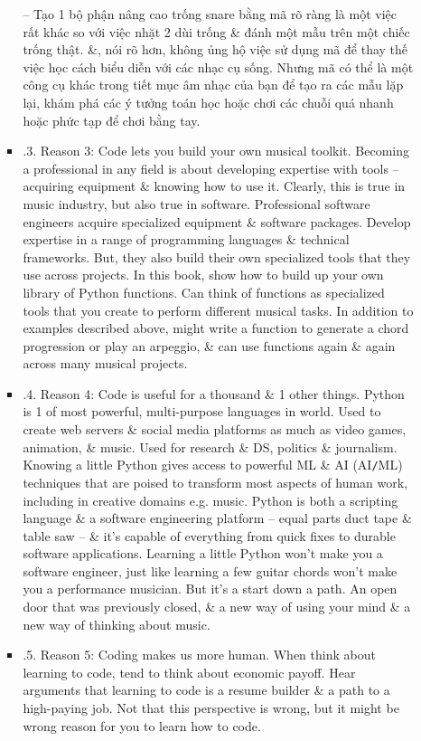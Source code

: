 \documentclass{article}
\begin{document}
\begin{itemize}
\begin{itemize}
\begin{itemize}
			-- Tạo 1 bộ phận nâng cao trống snare bằng mã rõ ràng là một việc rất khác so với việc nhặt 2 dùi trống \& đánh một mẫu trên một chiếc trống thật. \&, nói rõ hơn, không ủng hộ việc sử dụng mã để thay thế việc học cách biểu diễn với các nhạc cụ sống. Nhưng mã có thể là một công cụ khác trong tiết mục âm nhạc của bạn để tạo ra các mẫu lặp lại, khám phá các ý tưởng toán học hoặc chơi các chuỗi quá nhanh hoặc phức tạp để chơi bằng tay.
			\item {.3. Reason 3: Code lets you build your own musical toolkit.} Becoming a professional in any field is about developing expertise with tools -- acquiring equipment \& knowing how to use it. Clearly, this is true in music industry, but also true in software. Professional software engineers acquire specialized equipment \& software packages. Develop expertise in a range of programming languages \& technical frameworks. But, they also build their own specialized tools that they use across projects. In this book, show how to build up your own library of Python functions. Can think of functions as specialized tools that you create to perform different musical tasks. In addition to examples described above, might write a function to generate a chord progression or play an arpeggio, \& can use functions again \& again across many musical projects.
			\item {.4. Reason 4: Code is useful for a thousand \& 1 other things.} Python is 1 of most powerful, multi-purpose languages in world. Used to create web servers \& social media platforms as much as video games, animation, \& music. Used for research \& DS, politics \& journalism. Knowing a little Python gives access to powerful ML \& AI (AI{\tt/}ML) techniques that are poised to transform most aspects of human work, including in creative domains e.g. music. Python is both a scripting language \& a software engineering platform -- equal parts duct tape \& table saw -- \& it's capable of everything from quick fixes to durable software applications. Learning a little Python won't make you a software engineer, just like learning a few guitar chords won't make you a performance musician. But it's a start down a path. An open door that was previously closed, \& a new way of using your mind \& a new way of thinking about music.
			\item {.5. Reason 5: Coding makes us more human.} When think about learning to code, tend to think about economic payoff. Hear arguments that learning to code is a resume builder \& a path to a high-paying job. Not that this perspective is wrong, but it might be wrong reason for you to learn how to code.
			

\end{itemize}
\end{itemize}
\end{itemize}
\end{document}

